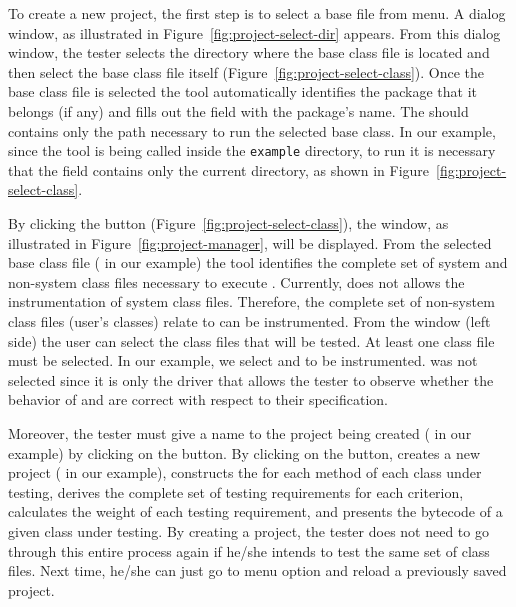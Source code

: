 

To create a new project, the first step is to select a base
 file from  menu. A
dialog window, as illustrated in
Figure~\ref{fig:project-select-dir} appears. From this dialog
window, the tester selects the directory where the base class file
is located and then select the base class file itself
(Figure~\ref{fig:project-select-class}). Once the base class file
is selected the tool automatically identifies the package that it
belongs (if any) and fills out the  field with the
package's name. The  should contains only the path
necessary to run the selected base class. In our example, since
the tool is being called inside the \verb+example+ directory, to
run  it is necessary that the
 field contains only the current directory, as shown
in Figure~\ref{fig:project-select-class}.



By clicking the  button
(Figure~\ref{fig:project-select-class}), the 
window, as illustrated in Figure~\ref{fig:project-manager}, will
be displayed. From the selected base class file (
in our example) the tool identifies the complete set of system and
non-system class files necessary to execute .
Currently, \toolname does not allows the instrumentation of system
class files. Therefore, the complete set of non-system class files
(user's classes) relate to  can be instrumented.
From the  window (left side) the user can
select the class files that will be tested. At least one class
file must be selected. In our example, we select
 and  to be instrumented.
 was not selected since it is only the driver that
allows the tester to observe whether the behavior of
 and  are correct with respect to
their specification.



Moreover, the tester must give a name to the project being created
( in our example) by clicking on the
 button. By clicking on the  button, \toolname
creates a new project ( in our example),
constructs the \DUG for each method of each class under testing,
derives the complete set of testing requirements for each
criterion, calculates the weight of each testing requirement, and
presents the bytecode of a given class under testing. By creating
a project, the tester does not need to go through this entire
process again if he/she intends to test the same set of class
files. Next time, he/she can just go to  menu option and reload a previously saved project.

